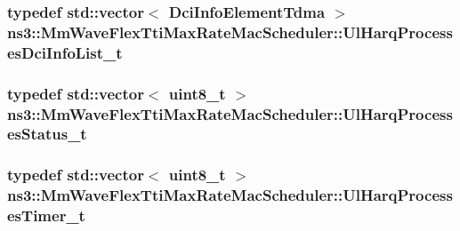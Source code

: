 \subsubsection[{\texorpdfstring{Ul\+Harq\+Processes\+Dci\+Info\+List\+\_\+t}{UlHarqProcessesDciInfoList_t}}]{\setlength{\rightskip}{0pt plus 5cm}typedef std\+::vector$<$ {\bf Dci\+Info\+Element\+Tdma} $>$ {\bf ns3\+::\+Mm\+Wave\+Flex\+Tti\+Max\+Rate\+Mac\+Scheduler\+::\+Ul\+Harq\+Processes\+Dci\+Info\+List\+\_\+t}}\hypertarget{classns3_1_1MmWaveFlexTtiMaxRateMacScheduler_a4e95b2440884f66e129e34b9c2fad48f}{}\label{classns3_1_1MmWaveFlexTtiMaxRateMacScheduler_a4e95b2440884f66e129e34b9c2fad48f}
\subsubsection[{\texorpdfstring{Ul\+Harq\+Processes\+Status\+\_\+t}{UlHarqProcessesStatus_t}}]{\setlength{\rightskip}{0pt plus 5cm}typedef std\+::vector$<$ uint8\+\_\+t $>$ {\bf ns3\+::\+Mm\+Wave\+Flex\+Tti\+Max\+Rate\+Mac\+Scheduler\+::\+Ul\+Harq\+Processes\+Status\+\_\+t}}\hypertarget{classns3_1_1MmWaveFlexTtiMaxRateMacScheduler_a372b94d5ee1b47bb9005acc067ee9459}{}\label{classns3_1_1MmWaveFlexTtiMaxRateMacScheduler_a372b94d5ee1b47bb9005acc067ee9459}
\subsubsection[{\texorpdfstring{Ul\+Harq\+Processes\+Timer\+\_\+t}{UlHarqProcessesTimer_t}}]{\setlength{\rightskip}{0pt plus 5cm}typedef std\+::vector$<$ uint8\+\_\+t $>$ {\bf ns3\+::\+Mm\+Wave\+Flex\+Tti\+Max\+Rate\+Mac\+Scheduler\+::\+Ul\+Harq\+Processes\+Timer\+\_\+t}}\hypertarget{classns3_1_1MmWaveFlexTtiMaxRateMacScheduler_a5f21f8a4c82fd8a654655918894dd007}{}\label{classns3_1_1MmWaveFlexTtiMaxRateMacScheduler_a5f21f8a4c82fd8a654655918894dd007}


